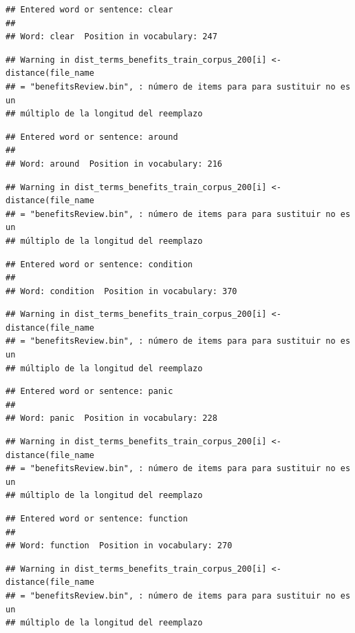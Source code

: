\documentclass[spanish,]{article}
\begin{document}
\begin{verbatim}
## Entered word or sentence: clear
## 
## Word: clear  Position in vocabulary: 247
\end{verbatim}

\begin{verbatim}
## Warning in dist_terms_benefits_train_corpus_200[i] <- distance(file_name
## = "benefitsReview.bin", : número de items para para sustituir no es un
## múltiplo de la longitud del reemplazo
\end{verbatim}

\begin{verbatim}
## Entered word or sentence: around
## 
## Word: around  Position in vocabulary: 216
\end{verbatim}

\begin{verbatim}
## Warning in dist_terms_benefits_train_corpus_200[i] <- distance(file_name
## = "benefitsReview.bin", : número de items para para sustituir no es un
## múltiplo de la longitud del reemplazo
\end{verbatim}

\begin{verbatim}
## Entered word or sentence: condition
## 
## Word: condition  Position in vocabulary: 370
\end{verbatim}

\begin{verbatim}
## Warning in dist_terms_benefits_train_corpus_200[i] <- distance(file_name
## = "benefitsReview.bin", : número de items para para sustituir no es un
## múltiplo de la longitud del reemplazo
\end{verbatim}

\begin{verbatim}
## Entered word or sentence: panic
## 
## Word: panic  Position in vocabulary: 228
\end{verbatim}

\begin{verbatim}
## Warning in dist_terms_benefits_train_corpus_200[i] <- distance(file_name
## = "benefitsReview.bin", : número de items para para sustituir no es un
## múltiplo de la longitud del reemplazo
\end{verbatim}

\begin{verbatim}
## Entered word or sentence: function
## 
## Word: function  Position in vocabulary: 270
\end{verbatim}

\begin{verbatim}
## Warning in dist_terms_benefits_train_corpus_200[i] <- distance(file_name
## = "benefitsReview.bin", : número de items para para sustituir no es un
## múltiplo de la longitud del reemplazo
\end{verbatim}
\end{document}
